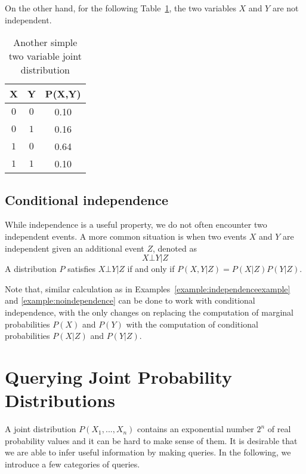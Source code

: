 \begin{example}\label{example:noindependence}
On the other hand, for the following Table~\ref{tab:simpleJointProbability2}, the two variables $X$ and $Y$ are not independent.  

\begin{table}[!htbp]
    \centering
    \begin{tabular}{|c|c|c|}
    \hline
        X & Y & P(X,Y)  \\
        \hline
        $0$  &  $0$ & 0.10 \\
        $0$  &  $1$ & 0.16 \\
        $1$  &  $0$ & 0.64 \\
        $1$  &  $1$ & 0.10 \\
        \hline
    \end{tabular}
    \caption{Another simple two variable joint distribution}
    \label{tab:simpleJointProbability2}
\end{table}
\end{example}


\subsection*{Conditional independence}


While independence is a useful property, we do not often encounter two independent events.  
A more common situation is when two events $X$ and $Y$ are independent given an additional event $Z$, denoted as 
 \begin{equation}
     X \bot Y | Z
 \end{equation}
A distribution $P$ satisfies $X \bot Y | Z$ if and only if $P(X,Y | Z)=P(X | Z)P(Y | Z)$. 

Note that, similar calculation as in Examples~\ref{example:independenceexample} and \ref{example:noindependence} can be done to work with conditional independence, with the only changes on replacing the computation of marginal probabilities $P(X)$ and $P(Y)$ with the computation of conditional probabilities $P(X | Z)$ and $P(Y | Z)$.


\section{Querying Joint Probability Distributions}

A joint distribution $P(X_1,...,X_n)$ contains an exponential number $2^n$ of real probability values and it can be hard to make sense of them. It is desirable that we are able to infer useful information by making queries. 
%
In the following, we introduce a few categories of queries. 

